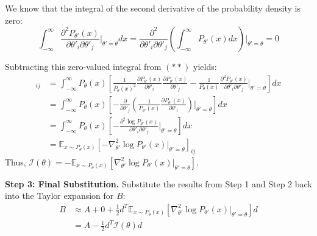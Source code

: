 \begin{solution}
\begin{itemize}
              We know that the integral of the second derivative of the probability density is zero:
              \[
                  \int_{-\infty}^{\infty} \frac{\partial^2 P_{\theta'}(x)}{\partial \theta'_i \partial \theta'_j} \Bigg|_{\theta'=\theta} dx = \frac{\partial^2}{\partial \theta'_i \partial \theta'_j} \left( \int_{-\infty}^{\infty} P_{\theta'}(x) dx \right) \Bigg|_{\theta'=\theta} = 0
              \]

              Subtracting this zero-valued integral from $(**)$ yields:
              \begin{align*}
                  [\mathcal{I}(\theta)]_{ij} & = \int_{-\infty}^{\infty} P_\theta(x) \left[ \frac{1}{P_\theta(x)^2} \frac{\partial P_{\theta'}(x)}{\partial \theta'_i} \frac{\partial P_{\theta'}(x)}{\partial \theta'_j} - \frac{1}{P_\theta(x)} \frac{\partial^2 P_{\theta'}(x)}{\partial \theta'_i \partial \theta'_j} \Bigg|_{\theta'=\theta} \right] dx \\
                                             & = \int_{-\infty}^{\infty} P_\theta(x) \left[ - \frac{\partial}{\partial \theta'_j} \left( \frac{1}{P_{\theta'}(x)} \frac{\partial P_{\theta'}(x)}{\partial \theta'_i} \right) \Bigg|_{\theta'=\theta} \right] dx                                                                                              \\
                                             & = \int_{-\infty}^{\infty} P_\theta(x) \left[ - \frac{\partial^2 \log P_{\theta'}(x)}{\partial \theta'_i \partial \theta'_j} \Bigg|_{\theta'=\theta} \right] dx                                                                                                                                                \\
                                             & = \mathbb{E}_{x \sim P_\theta(x)} \left[ - \nabla_{\theta'}^2 \log P_{\theta'}(x) \Big|_{\theta'=\theta} \right]_{ij}
              \end{align*}
              Thus, $\mathcal{I}(\theta) = - \mathbb{E}_{x \sim P_\theta(x)} \left[ \nabla_{\theta'}^2 \log P_{\theta'}(x) \Big|_{\theta'=\theta} \right]$.

              \textbf{Step 3: Final Substitution.}
              Substitute the results from Step 1 and Step 2 back into the Taylor expansion for $B$:
              \begin{align*}
                  B & \approx A + 0 + \frac{1}{2} d^T \mathbb{E}_{x \sim P_\theta(x)} \left[ \nabla_{\theta'}^2 \log P_{\theta'}(x) \Big|_{\theta'=\theta} \right] d \\
                    & = A - \frac{1}{2} d^T \mathcal{I}(\theta) d
              \end{align*}


\end{itemize}
\end{solution}
